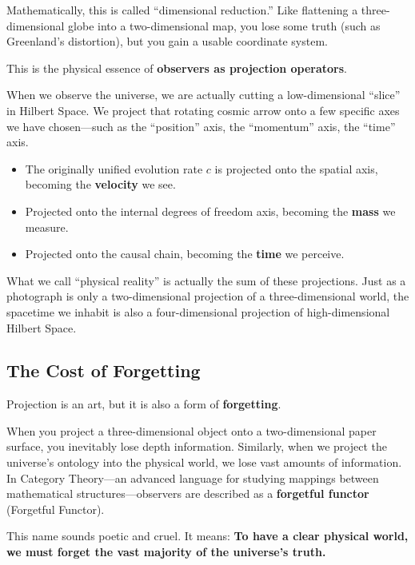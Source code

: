 Mathematically, this is called ``dimensional reduction.'' Like flattening a three-dimensional globe into a two-dimensional map, you lose some truth (such as Greenland's distortion), but you gain a usable coordinate system.

This is the physical essence of \textbf{observers as projection operators}.

When we observe the universe, we are actually cutting a low-dimensional ``slice'' in Hilbert Space. We project that rotating cosmic arrow onto a few specific axes we have chosen---such as the ``position'' axis, the ``momentum'' axis, the ``time'' axis.

\begin{itemize}
\item The originally unified evolution rate $c$ is projected onto the spatial axis, becoming the \textbf{velocity} we see.

\item Projected onto the internal degrees of freedom axis, becoming the \textbf{mass} we measure.

\item Projected onto the causal chain, becoming the \textbf{time} we perceive.
\end{itemize}

What we call ``physical reality'' is actually the sum of these projections. Just as a photograph is only a two-dimensional projection of a three-dimensional world, the spacetime we inhabit is also a four-dimensional projection of high-dimensional Hilbert Space.

\subsection{The Cost of Forgetting}

Projection is an art, but it is also a form of \textbf{forgetting}.

When you project a three-dimensional object onto a two-dimensional paper surface, you inevitably lose depth information. Similarly, when we project the universe's ontology into the physical world, we lose vast amounts of information. In Category Theory---an advanced language for studying mappings between mathematical structures---observers are described as a \textbf{forgetful functor} (Forgetful Functor).

This name sounds poetic and cruel. It means: \textbf{To have a clear physical world, we must forget the vast majority of the universe's truth.}

